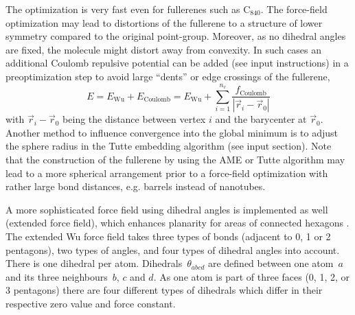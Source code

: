 \documentclass[article,a4paper,twoside]{memoir}
\let\acr=\textsmaller
\newcommand{\C}[1]{\ensuremath{\mathrm{C}_{#1}}}
\begin{document}
The \acr{HOFF} optimization is very fast even for fullerenes such as \C{840}. 
The \acr{HOFF} force-field optimization may lead to distortions of the fullerene to a structure of lower symmetry compared to the original point-group. 
Moreover, as no dihedral angles are fixed, the molecule might distort away from convexity. In such cases an additional Coulomb repulsive potential can
be added (see input instructions) in a preoptimization step to avoid large ``dents'' or edge crossings of the fullerene,
\begin{equation}
  \label{eq:Ewu}
  E = E_{\mathrm{Wu}} + E_{\mathrm{Coulomb}} = E_{\mathrm{Wu}} + \sum_{i=1}^{n_v} \frac{f_{\mathrm{Coulomb}}}{|\vec{r}_i - \vec{r}_0|}
\end{equation}
with $\vec{r}_i - \vec{r}_0$ being the distance between vertex $i$ and the barycenter at $\vec{r}_0$. Another method to influence convergence into the global
minimum is to adjust the sphere radius in the Tutte embedding algorithm (see input section).
Note that the construction of the fullerene by using the AME or Tutte algorithm may
lead to a more spherical arrangement prior to a force-field optimization with rather large bond distances, 
e.g. barrels instead of nanotubes. 

A more sophisticated force field using dihedral angles is implemented as well (extended \acr{HOFF} force field),
which enhances planarity for areas of connected hexagons \cite{Wirz2015}. The extended Wu force field takes three types of bonds (adjacent to 0, 1 or 2 pentagons),
two types of angles, and four types of dihedral angles into account. There is one dihedral per atom.  Dihedrals~$\theta_{abcd}$ 
are defined between one atom~$a$ and its three neighbours~$b$, $c$ and $d$.  As one atom is part of three faces
(0, 1, 2, or 3 pentagons) there are four different types of dihedrals which differ in their respective
zero value and force constant.
\end{document}
